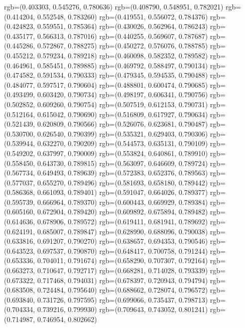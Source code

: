 {{{					rgb=(0.403303, 0.545276, 0.780636)
					rgb=(0.408790, 0.548951, 0.782021)
					rgb=(0.414204, 0.552548, 0.783260)
					rgb=(0.419551, 0.556072, 0.784376)
					rgb=(0.424823, 0.559551, 0.785364)
					rgb=(0.430026, 0.562964, 0.786243)
					rgb=(0.435177, 0.566313, 0.787016)
					rgb=(0.440255, 0.569607, 0.787687)
					rgb=(0.445286, 0.572867, 0.788275)
					rgb=(0.450272, 0.576076, 0.788785)
					rgb=(0.455212, 0.579234, 0.789218)
					rgb=(0.460098, 0.582352, 0.789582)
					rgb=(0.464961, 0.585451, 0.789885)
					rgb=(0.469792, 0.588497, 0.790134)
					rgb=(0.474582, 0.591534, 0.790333)
					rgb=(0.479345, 0.594535, 0.790488)
					rgb=(0.484077, 0.597517, 0.790604)
					rgb=(0.488801, 0.600474, 0.790685)
					rgb=(0.493499, 0.603420, 0.790734)
					rgb=(0.498197, 0.606341, 0.790756)
					rgb=(0.502852, 0.609260, 0.790754)
					rgb=(0.507519, 0.612153, 0.790731)
					rgb=(0.512164, 0.615042, 0.790690)
					rgb=(0.516809, 0.617927, 0.790634)
					rgb=(0.521439, 0.620809, 0.790566)
					rgb=(0.526076, 0.623681, 0.790487)
					rgb=(0.530700, 0.626540, 0.790399)
					rgb=(0.535321, 0.629403, 0.790306)
					rgb=(0.539944, 0.632270, 0.790209)
					rgb=(0.544573, 0.635131, 0.790109)
					rgb=(0.549202, 0.637997, 0.790009)
					rgb=(0.553824, 0.640861, 0.789910)
					rgb=(0.558450, 0.643730, 0.789815)
					rgb=(0.563097, 0.646609, 0.789724)
					rgb=(0.567734, 0.649493, 0.789639)
					rgb=(0.572383, 0.652376, 0.789563)
					rgb=(0.577037, 0.655270, 0.789496)
					rgb=(0.581693, 0.658180, 0.789442)
					rgb=(0.586368, 0.661093, 0.789401)
					rgb=(0.591047, 0.664026, 0.789377)
					rgb=(0.595739, 0.666964, 0.789370)
					rgb=(0.600443, 0.669929, 0.789384)
					rgb=(0.605160, 0.672904, 0.789420)
					rgb=(0.609892, 0.675894, 0.789482)
					rgb=(0.614636, 0.678906, 0.789572)
					rgb=(0.619411, 0.681941, 0.789692)
					rgb=(0.624191, 0.685007, 0.789847)
					rgb=(0.628990, 0.688096, 0.790038)
					rgb=(0.633816, 0.691207, 0.790270)
					rgb=(0.638657, 0.694353, 0.790546)
					rgb=(0.643523, 0.697537, 0.790870)
					rgb=(0.648417, 0.700758, 0.791244)
					rgb=(0.653336, 0.704011, 0.791674)
					rgb=(0.658290, 0.707307, 0.792164)
					rgb=(0.663273, 0.710647, 0.792717)
					rgb=(0.668281, 0.714028, 0.793339)
					rgb=(0.673322, 0.717468, 0.794031)
					rgb=(0.678397, 0.720943, 0.794794)
					rgb=(0.683508, 0.724484, 0.795640)
					rgb=(0.688662, 0.728074, 0.796572)
					rgb=(0.693840, 0.731726, 0.797595)
					rgb=(0.699066, 0.735437, 0.798713)
					rgb=(0.704334, 0.739216, 0.799930)
					rgb=(0.709643, 0.743052, 0.801241)
					rgb=(0.714987, 0.746954, 0.802662)
}}}

